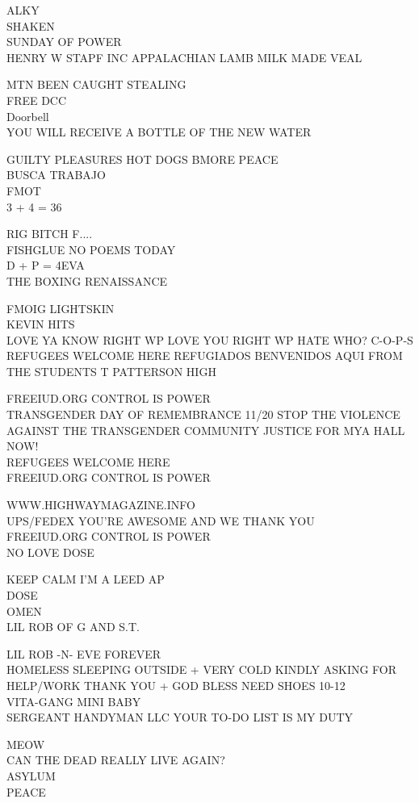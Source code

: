 \documentclass[10pt,letterpaper]{article}
\begin{document}
ALKY\\
SHAKEN\\
SUNDAY OF POWER\\
HENRY W STAPF INC APPALACHIAN LAMB MILK MADE VEAL

MTN BEEN CAUGHT STEALING\\
FREE DCC\\
Doorbell\\
YOU WILL RECEIVE A BOTTLE OF THE NEW WATER

GUILTY PLEASURES HOT DOGS BMORE PEACE\\
BUSCA TRABAJO\\
FMOT\\
3 + 4 = 36

RIG BITCH F....\\
FISHGLUE NO POEMS TODAY\\
D + P = 4EVA\\
THE BOXING RENAISSANCE

FMOIG LIGHTSKIN\\
KEVIN HITS\\
LOVE YA KNOW RIGHT WP LOVE YOU RIGHT WP HATE WHO? C{-}O{-}P{-}S\\
REFUGEES WELCOME HERE REFUGIADOS BENVENIDOS AQUI FROM THE STUDENTS T PATTERSON HIGH

FREEIUD.ORG CONTROL IS POWER\\
TRANSGENDER DAY OF REMEMBRANCE 11/20 STOP THE VIOLENCE AGAINST THE TRANSGENDER COMMUNITY JUSTICE FOR MYA HALL NOW!\\
REFUGEES WELCOME HERE\\
FREEIUD.ORG CONTROL IS POWER

WWW.HIGHWAYMAGAZINE.INFO\\
UPS/FEDEX YOU'RE AWESOME AND WE THANK YOU\\
FREEIUD.ORG CONTROL IS POWER\\
NO LOVE DOSE

KEEP CALM I'M A LEED AP\\
DOSE\\
OMEN\\
LIL ROB OF G AND S.T.

LIL ROB {-}N{-} EVE FOREVER\\
HOMELESS SLEEPING OUTSIDE + VERY COLD KINDLY ASKING FOR HELP/WORK THANK YOU + GOD BLESS NEED SHOES 10{-}12\\
VITA{-}GANG MINI BABY\\
SERGEANT HANDYMAN LLC YOUR TO{-}DO LIST IS MY DUTY

MEOW\\
CAN THE DEAD REALLY LIVE AGAIN?\\
ASYLUM\\
PEACE
\end{document}
